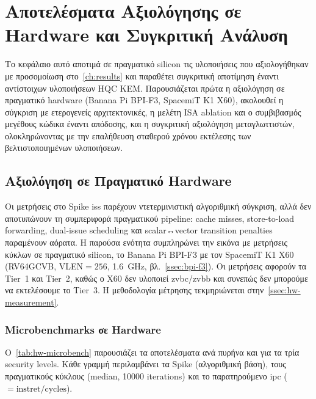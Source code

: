 \chapter{Αποτελέσματα Αξιολόγησης σε Hardware και Συγκριτική Ανάλυση}
\label{ch:discussion}

Το κεφάλαιο αυτό αποτιμά σε πραγματικό silicon τις υλοποιήσεις που αξιολογήθηκαν με προσομοίωση στο~\cref{ch:results} και παραθέτει συγκριτική αποτίμηση έναντι αντίστοιχων υλοποιήσεων HQC KEM. Παρουσιάζεται πρώτα η αξιολόγηση σε πραγματικό hardware (Banana Pi BPI-F3, SpacemiT K1 X60), ακολουθεί η σύγκριση με ετερογενείς αρχιτεκτονικές\ifTODO, η μελέτη ISA ablation και ο συμβιβασμός μεγέθους κώδικα έναντι απόδοσης\fi, και η συγκριτική αξιολόγηση μεταγλωττιστών\ifTODO{}, ολοκληρώνοντας με την επαλήθευση σταθερού χρόνου εκτέλεσης των βελτιστοποιημένων υλοποιήσεων\fi.

\section{Αξιολόγηση σε Πραγματικό Hardware}
\label{sec:hw-evaluation}

Οι μετρήσεις \instret στο Spike \gls{iss} παρέχουν ντετερμινιστική αλγοριθμική
σύγκριση, αλλά δεν αποτυπώνουν τη συμπεριφορά πραγματικού pipeline: cache misses,
store-to-load forwarding, dual-issue scheduling και scalar↔vector transition
penalties παραμένουν αόρατα. Η παρούσα ενότητα
συμπληρώνει την εικόνα με μετρήσεις κύκλων σε πραγματικό silicon, το Banana Pi
BPI-F3 με τον SpacemiT K1 X60 (RV64GCVB, VLEN$= \num{256}$, \SI{1.6}{\giga\hertz},
βλ.\ \cref{ssec:bpi-f3}). Οι μετρήσεις αφορούν τα Tier~1
και Tier~2, καθώς ο X60 δεν υλοποιεί 
\gls{zvbc}/\gls{zvbb} και συνεπώς δεν μπορούμε να εκτελέσουμε το Tier~3.
Η μεθοδολογία μέτρησης τεκμηριώνεται στην~\cref{ssec:hw-measurement}. 

\subsection{Microbenchmarks σε Hardware}
\label{ssec:hw-microbench}

Ο~\cref{tab:hw-microbench} παρουσιάζει τα αποτελέσματα ανά πυρήνα και για τα
τρία security levels. Κάθε γραμμή περιλαμβάνει τα Spike \instret (αλγοριθμική βάση),
τους πραγματικούς κύκλους (median, \num{10000} iterations) και το παρατηρούμενο
\gls{ipc} ($= \text{instret} / \text{cycles}$).

